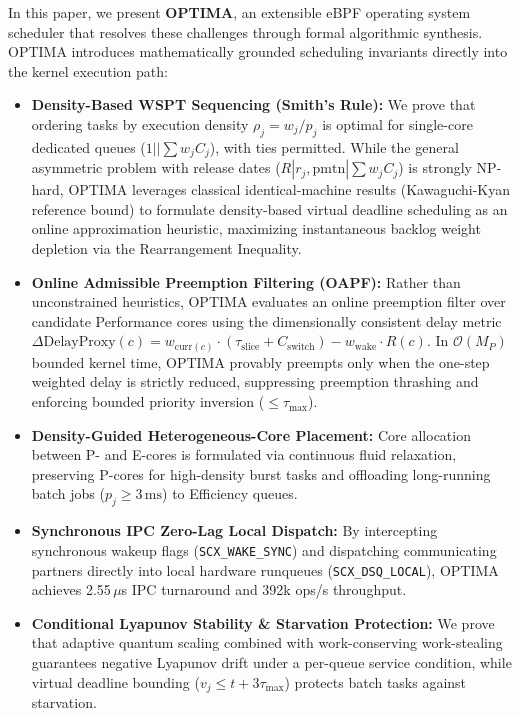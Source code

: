\documentclass[conference]{IEEEtran}
\begin{document}
In this paper, we present \textbf{OPTIMA}, an extensible eBPF operating system scheduler that resolves these challenges through formal algorithmic synthesis. OPTIMA introduces mathematically grounded scheduling invariants directly into the kernel execution path:
\begin{itemize}
    \item \textbf{Density-Based WSPT Sequencing (Smith's Rule):} We prove that ordering tasks by execution density $\rho_j = w_j / p_j$ is optimal for single-core dedicated queues ($1 || \sum w_j C_j$), with ties permitted. While the general asymmetric problem with release dates ($R | r_j, \text{pmtn} | \sum w_j C_j$) is strongly NP-hard, OPTIMA leverages classical identical-machine results (Kawaguchi-Kyan reference bound) to formulate density-based virtual deadline scheduling as an online approximation heuristic, maximizing instantaneous backlog weight depletion via the Rearrangement Inequality.
    \item \textbf{Online Admissible Preemption Filtering (OAPF):} Rather than unconstrained heuristics, OPTIMA evaluates an online preemption filter over candidate Performance cores using the dimensionally consistent delay metric $\Delta\mathrm{DelayProxy}(c) = w_{\mathrm{curr}(c)} \cdot (\tau_{\mathrm{slice}} + C_{\mathrm{switch}}) - w_{\mathrm{wake}} \cdot R(c)$. In $\mathcal{O}(M_P)$ bounded kernel time, OPTIMA provably preempts only when the one-step weighted delay is strictly reduced, suppressing preemption thrashing and enforcing bounded priority inversion ($\le \tau_{\max}$).
    \item \textbf{Density-Guided Heterogeneous-Core Placement:} Core allocation between P- and E-cores is formulated via continuous fluid relaxation, preserving P-cores for high-density burst tasks and offloading long-running batch jobs ($p_j \ge 3\,\text{ms}$) to Efficiency queues.
    \item \textbf{Synchronous IPC Zero-Lag Local Dispatch:} By intercepting synchronous wakeup flags (\texttt{SCX\_WAKE\_SYNC}) and dispatching communicating partners directly into local hardware runqueues (\texttt{SCX\_DSQ\_LOCAL}), OPTIMA achieves 2.55\,$\mu$s IPC turnaround and 392k ops/s throughput.
    \item \textbf{Conditional Lyapunov Stability \& Starvation Protection:} We prove that adaptive quantum scaling combined with work-conserving work-stealing guarantees negative Lyapunov drift under a per-queue service condition, while virtual deadline bounding ($v_j \le t + 3\tau_{\max}$) protects batch tasks against starvation.
\end{itemize}
\end{document}
